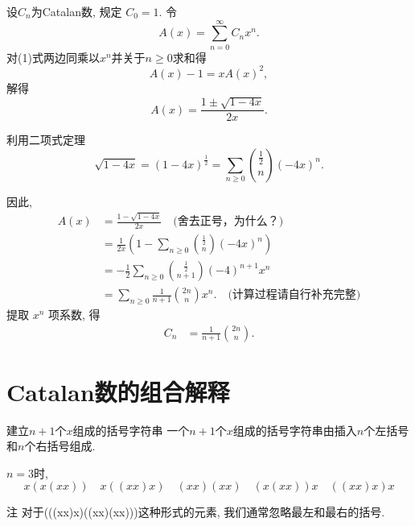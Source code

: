 \documentclass[punct]{beamer}
\begin{document}
\begin{frame}
    设$C_{n}$为Catalan数, 规定 $C_{0}=1$.
    令\[
    A(x)=\sum_{n=0}^{\infty}C_{n}x^{n}.
    \]对(1)式两边同乘以$x^{n}$并关于$n\geq0$求和得
    \[
    A(x)-1=xA(x)^{2},
    \]解得\[
    A(x)=\frac{1\pm \sqrt{1-4x}}{2x}.
    \]

%
     利用二项式定理
    $$
    \sqrt{1-4 x}=(1-4 x)^{\frac{1}{2}}=\sum_{n \geq 0}\binom{\frac{1}{2}}{n} \left(-4x\right)^n .
    $$

\end{frame}

\begin{frame}
       因此,
    \begin{align*}
   A(x) & =\frac{1-\sqrt{1-4x}}{2x}        \quad \mbox{(舍去正号，为什么？)} \\[5pt]
        &=\frac{1}{2 x}\left(1-\sum_{n \geq 0}\binom{\frac{1}{2}}{n}(-4 x)^n\right) \\[5pt]
        &=-\frac{1}{2} \sum_{n \geq 0}\binom{\frac{1}{2}}{n+1}(-4)^{n+1} x^n \\[5pt]
        &= \sum_{n\ge 0}\frac{1}{n+1}\binom{2n}{n} x^n.      \quad \mbox{(计算过程请自行补充完整)}
    \end{align*}
    提取 $x^n$ 项系数, 得
\begin{align*}
 C_n
& =\frac{1}{n+1}\binom{2n}{n} .
\end{align*}


\end{frame}



\section{Catalan数的组合解释}


\begin{frame}{建立$n+1$个$x$组成的括号字符串}
    一个$n+1$个$x$组成的括号字符串由插入$n$个左括号和$n$个右括号组成.

    $n=3$时,
    \[
    x(x(xx)) \quad x((xx)x)\quad (xx)(xx)\quad (x(xx))x\quad ((xx)x)x
    \]
    \begin{block}{注}
        对于(((xx)x)((xx)(xx)))这种形式的元素, 我们通常忽略最左和最右的括号.
    \end{block}
\end{frame}
\end{document}

